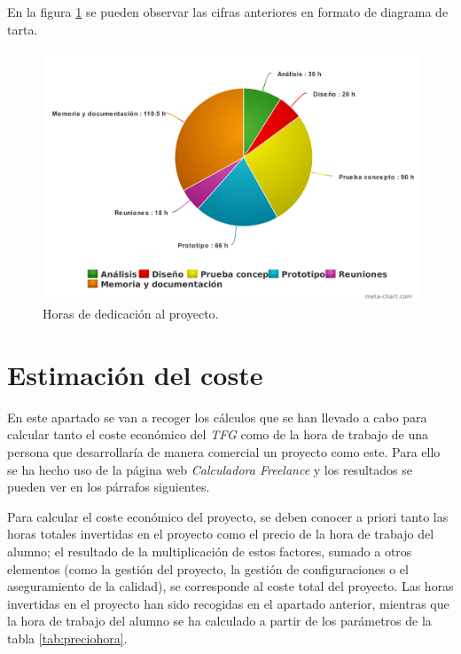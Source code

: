 En la figura \ref{fig:esfuerzos} se pueden observar las cifras anteriores en formato de diagrama de tarta. 

\begin{figure}[!h]
    \centering
    \includegraphics[width=\textwidth,height=\textheight,keepaspectratio]{Imagenes/esfuerzos}
    \caption{Horas de dedicación al proyecto.}
    \label{fig:esfuerzos}
\end{figure}


\section{Estimación del coste} 
\label{gestion.estimacion}

En este apartado se van a recoger los cálculos que se han llevado a cabo para calcular tanto el coste económico del \textit{TFG} como de la hora de trabajo de una persona que desarrollaría de manera comercial un proyecto como este. Para ello se ha hecho uso de la página web \textit{Calculadora Freelance} \cite{calculadorafreelance} y los resultados se pueden ver en los párrafos siguientes. 
\par 
Para calcular el coste económico del proyecto, se deben conocer a priori tanto las horas totales invertidas en el proyecto como el precio de la hora de trabajo del alumno; el resultado de la multiplicación de estos factores, sumado a otros elementos (como la gestión del proyecto, la gestión de configuraciones o el aseguramiento de la calidad), se corresponde al coste total del proyecto. Las horas invertidas en el proyecto han sido recogidas en el apartado anterior, mientras que la hora de trabajo del alumno se ha calculado a partir de los parámetros de la tabla \ref{tab:preciohora}.



